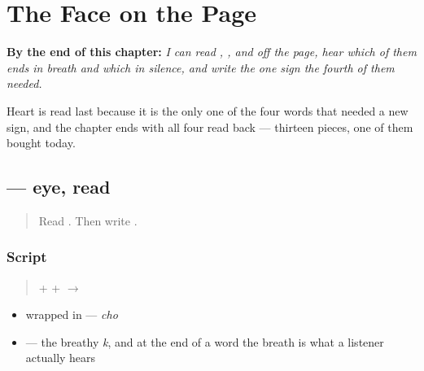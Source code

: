 
\chapter{The Face on the Page}
\label{ch:bn-face-on-the-page}

\begin{chapteropening}
\textbf{By the end of this chapter:} \emph{I can read , ,  and  off the page, hear which of them ends in breath and which in silence, and write the one sign the fourth of them needed.}

Heart is read last because it is the only one of the four words that needed a new sign, and the chapter ends with all four read back — thirteen pieces, one of them bought today.
\end{chapteropening}

\section[\texorpdfstring{\bn{চোখ} (chokh)}{চোখ (chokh)}]{ — eye, read}

\label{lesson:BN-W04-chokh-read}



\begin{quote}
Read \textbf{}. Then write \textbf{}.
\end{quote}

\subsection*{Script}
\begin{quote}
\textbf{} + \textbf{} + \textbf{} $\to$ \textbf{}
\end{quote}

\begin{itemize}
\raggedright
  \item \textbf{} wrapped in \textbf{} — \emph{cho}
  \item \textbf{} — the breathy \emph{k}, and at the end of a word the breath is what a listener actually hears
\end{itemize}

